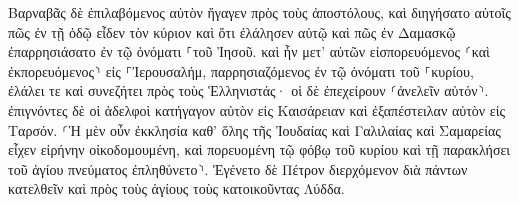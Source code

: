 \documentclass{openreader}
\begin{document}
Βαρναβᾶς δὲ ἐπιλαβόμενος αὐτὸν ἤγαγεν πρὸς τοὺς ἀποστόλους, καὶ διηγήσατο αὐτοῖς πῶς ἐν τῇ ὁδῷ εἶδεν τὸν κύριον καὶ ὅτι ἐλάλησεν αὐτῷ καὶ πῶς ἐν Δαμασκῷ ἐπαρρησιάσατο ἐν τῷ ὀνόματι ⸀τοῦ Ἰησοῦ. 
καὶ ἦν μετ’ αὐτῶν εἰσπορευόμενος ⸂καὶ ἐκπορευόμενος⸃ εἰς ⸀Ἰερουσαλήμ, παρρησιαζόμενος ἐν τῷ ὀνόματι τοῦ ⸀κυρίου, 
ἐλάλει τε καὶ συνεζήτει πρὸς τοὺς Ἑλληνιστάς· οἱ δὲ ἐπεχείρουν ⸂ἀνελεῖν αὐτόν⸃. 
ἐπιγνόντες δὲ οἱ ἀδελφοὶ κατήγαγον αὐτὸν εἰς Καισάρειαν καὶ ἐξαπέστειλαν αὐτὸν εἰς Ταρσόν. 
⸂Ἡ μὲν οὖν ἐκκλησία καθ’ ὅλης τῆς Ἰουδαίας καὶ Γαλιλαίας καὶ Σαμαρείας εἶχεν εἰρήνην οἰκοδομουμένη, καὶ πορευομένη τῷ φόβῳ τοῦ κυρίου καὶ τῇ παρακλήσει τοῦ ἁγίου πνεύματος ἐπληθύνετο⸃. 
Ἐγένετο δὲ Πέτρον διερχόμενον διὰ πάντων κατελθεῖν καὶ πρὸς τοὺς ἁγίους τοὺς κατοικοῦντας Λύδδα. 
\end{document}
